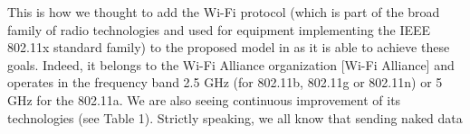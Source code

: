  \cite{madhavan_mastering_2015}    \newline 
 \cite{mahmoud_study_2016}    \newline 
 \cite{servi_m/m/1_2002}    \newline 
 \cite{springer_spread_2000}    \newline 
 \cite{barro_towards_2018}   This is how we thought to add the Wi-Fi protocol (which is part of the broad family of radio technologies and used for equipment implementing the IEEE 802.11x standard family) to the proposed model in \cite{barro_smart_2019} as it is able to achieve these goals. Indeed, it belongs to the Wi-Fi Alliance organization [Wi-Fi Alliance] and operates in the frequency band 2.5 GHz (for 802.11b, 802.11g or 802.11n) or 5 GHz for the 802.11a. We are also seeing continuous improvement of its technologies (see Table 1). Strictly speaking, we all know that sending naked data   \newline 
